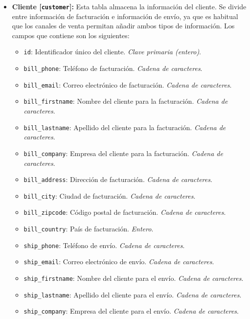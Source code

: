 \begin{itemize}
\begin{itemize}
          \end{itemize}
    \item \textbf{Cliente [\texttt{customer}]:} Esta tabla almacena la información del cliente. Se divide entre información de facturación e información de envío, ya que es habitual que los canales de venta permitan añadir ambos tipos de información. Los campos que contiene son los siguientes:
          \begin{itemize}
              \item \texttt{id}: Identificador único del cliente. \textit{Clave primaria (entero)}.
              \item \texttt{bill\_phone}: Teléfono de facturación. \textit{Cadena de caracteres}.
              \item \texttt{bill\_email}: Correo electrónico de facturación. \textit{Cadena de caracteres}.
              \item \texttt{bill\_firstname}: Nombre del cliente para la facturación. \textit{Cadena de caracteres}.
              \item \texttt{bill\_lastname}: Apellido del cliente para la facturación. \textit{Cadena de caracteres}.
              \item \texttt{bill\_company}: Empresa del cliente para la facturación. \textit{Cadena de caracteres}.
              \item \texttt{bill\_address}: Dirección de facturación. \textit{Cadena de caracteres}.
              \item \texttt{bill\_city}: Ciudad de facturación. \textit{Cadena de caracteres}.
              \item \texttt{bill\_zipcode}: Código postal de facturación. \textit{Cadena de caracteres}.
              \item \texttt{bill\_country}: País de facturación. \textit{Entero}.
              \item \texttt{ship\_phone}: Teléfono de envío. \textit{Cadena de caracteres}.
              \item \texttt{ship\_email}: Correo electrónico de envío. \textit{Cadena de caracteres}.
              \item \texttt{ship\_firstname}: Nombre del cliente para el envío. \textit{Cadena de caracteres}.
              \item \texttt{ship\_lastname}: Apellido del cliente para el envío. \textit{Cadena de caracteres}.
              \item \texttt{ship\_company}: Empresa del cliente para el envío. \textit{Cadena de caracteres}.

\end{itemize}
\end{itemize}
